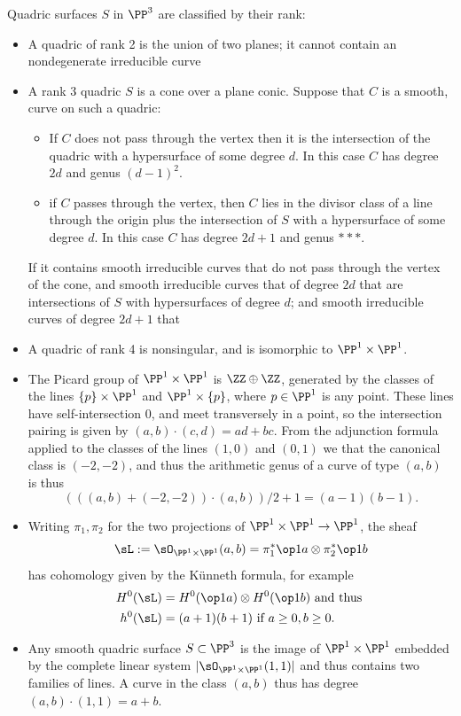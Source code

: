 \begin{example}[Quadrics in $\PP^3$]\label{Div of quadric}
 
Quadric surfaces $S$ in $\PP^3$ are classified by their rank:
\begin{itemize}
\item A quadric of rank 2 is the union of two planes; it cannot contain an nondegenerate irreducible curve
\item A rank 3 quadric $S$ is a cone over a plane conic. Suppose that $C$ is a smooth,
curve on such a quadric:
\begin{itemize}
\item  If $C$  does
not pass through the vertex then it is the intersection of the quadric with a hypersurface of some
degree $d$. In this case $C$ has degree $2d$ and genus $(d-1)^2$. 
 \item if $C$ passes through the vertex, then $C$ lies in the divisor class of a line through the origin plus the intersection of $S$ with a hypersurface of some degree $d$. In this case $C$ has degree $2d+1$ and 
 genus $***$. 
\end{itemize}

If  it contains smooth irreducible curves that do not pass through the vertex of the cone, and smooth irreducible curves that of
degree $2d$ that are intersections of $S$ with hypersurfaces of degree $d$; and smooth 
irreducible curves of degree $2d+1$ that 

\item A quadric of rank 4 is nonsingular, and is isomorphic to $\PP^1\times \PP^1$.


\item The Picard group of $\PP^1\times \PP^1$ is $\ZZ\oplus \ZZ$, generated by the 
classes of the lines $\{p\}\times \PP^1$ and $\PP^1\times \{p\}$, where $p\in \PP^1$
is any point. These lines have self-intersection 0, and meet transversely in a point,
so the intersection pairing is given by $(a,b)\cdot(c,d) = ad+bc$. From the adjunction formula
applied to the classes of the lines $(1,0)$ and $(0,1)$ we that the canonical
class is $(-2,-2)$, and thus the arithmetic genus of a curve of type $(a,b)$ is thus
$$
\left(((a,b)+(-2,-2))\cdot (a,b)\right)/2 +1 = (a-1)(b-1).
$$

\item Writing $\pi_1, \pi_2$ for the two projections of
$\PP^1\times \PP^1 \to \PP^1$, the sheaf 
$$
\sL := \sO_{\PP^1\times \PP^1}(a,b) = \pi_1^*\op1a \otimes \pi_2^*\op1b
$$
has cohomology given by the K\"unneth formula, for example
\begin{align*}
 H^0(\sL) &= H^0(\op1a)\otimes H^0(\op1b) \hbox{ and thus }\\
 h^0(\sL) &= (a+1)(b+1) \hbox{ if } a\geq 0, b\geq 0.
\end{align*}

\item Any smooth quadric surface $S\subset \PP^3$ is the 
image of $\PP^1\times \PP^1$ embedded by the complete linear system
$|\sO_{\PP^1\times \PP^1}(1,1)|$ and thus contains two families of lines. 
A curve in the class $(a,b)$ thus has degree $(a,b)\cdot(1,1) = a+b$. 
\end{itemize}
\end{example}


